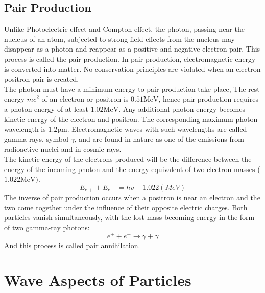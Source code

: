 \subsection{Pair Production}
Unlike Photoelectric effect and Compton effect,  the photon, passing near the nucleus of an atom,  subjected to strong field effects from the nucleus  may disappear as a photon and reappear as a positive and negative electron pair. This process is called the pair production. In  pair production,  electromagnetic energy is converted into matter.  No conservation principles are violated when an electron positron pair is created.\\
The photon must have a minimum energy to pair production take place,
The rest energy $m c^{2}$ of an electron or positron is $0.51 \mathrm{MeV}$, hence pair production requires a photon energy of at least $1.02 \mathrm{MeV}$. Any additional photon energy becomes kinetic energy of the electron and positron. The corresponding maximum photon wavelength is $1.2 \mathrm{pm}$. Electromagnetic waves with such wavelengths are called gamma rays, symbol $\gamma$, and are found in nature as one of the emissions from radioactive nuclei and in cosmic rays. \\
The kinetic energy of the electrons produced will be the difference between the energy of the incoming photon and the energy equivalent of two electron masses (  $1.022 \mathrm{MeV})$.
$$
{E}_{{e}+}+{E}_{{e}-}={h} v-{1 . 0 2 2}({M e V})
$$
The inverse of pair production occurs when a positron is near an electron and the two come together under the influence of their opposite electric charges. Both particles vanish simultaneously, with the lost mass becoming energy in the form of two gamma-ray photons:
$$
e^{+}+e^{-} \rightarrow \gamma+\gamma
$$
And this process is called pair annihilation.
\section{Wave Aspects of Particles}
